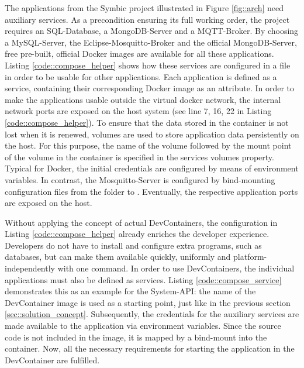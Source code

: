         The applications from the Symbic project illustrated in Figure \ref{fig::arch} need auxiliary services. As a precondition ensuring its full working order, the project requires an SQL-Database, a MongoDB-Server and a MQTT-Broker. By choosing a MySQL-Server, the Eclipse-Mosquitto-Broker and the official MongoDB-Server, free pre-built, official Docker images are available for all these applications. Listing \ref{code::compose_helper} shows how these services are configured in a  file in order to be usable for other applications. Each application is defined as a service, containing their corresponding Docker image as an attribute. In order to make the applications usable outside the virtual docker network, the internal network ports are exposed on the host system (see line 7, 16, 22 in Listing \ref{code::compose_helper}). To ensure that the data stored in the container is not lost when it is renewed, volumes are used to store application data persistently on the host. For this purpose, the name of the volume followed by the mount point of the volume in the container is specified in the services volumes property. Typical for Docker, the initial credentials are configured by means of environment variables. In contrast, the Mosquitto-Server is configured by bind-mounting configuration files from the  folder to . Eventually, the respective application ports are exposed on the host.\newline
        
        Without applying the concept of actual DevContainers, the configuration in Listing \ref{code::compose_helper} already enriches the developer experience. Developers do not have to install and configure extra programs, such as databases, but can make them available quickly, uniformly and platform-independently with one command.\newline
        In order to use DevContainers, the individual applications must also be defined as services. Listing \ref{code::compose_service} demonstrates this as an example for the System-\ac{API}: the name of the DevContainer image is used as a starting point, just like in the previous section \ref{sec::solution_concept}. Subsequently, the credentials for the auxiliary services are made available to the application via environment variables. Since the source code is not included in the image, it is mapped by a bind-mount into the container. Now, all the necessary requirements for starting the application in the DevContainer are fulfilled.\newline
